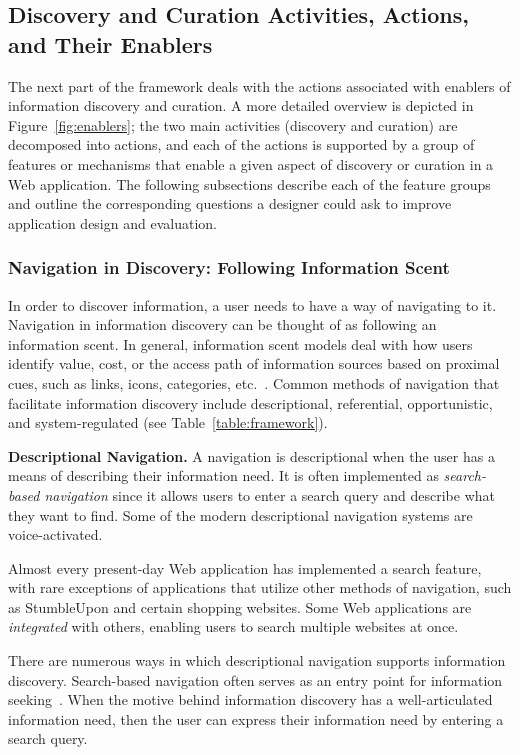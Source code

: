 \documentclass{sigchi}
\begin{document}
{\subsection{Discovery and Curation Activities, Actions, and Their \mbox{Enablers}}

The next part of the framework deals with the actions associated with enablers of information discovery and curation. A more detailed overview is depicted in Figure~\ref{fig:enablers}; the two main activities (discovery and curation) are decomposed into actions, and each of the actions is supported by a group of features or mechanisms that enable a given aspect of discovery or curation in a Web application.  The following subsections describe each of the feature groups and outline the corresponding questions a designer could ask to improve application design and evaluation.  

{\subsubsection{Navigation in Discovery: Following Information Scent}
In order to discover information, a user needs to have a way of navigating to it. Navigation in information discovery can be thought of as following an information scent. In general, information scent models deal with how users identify value, cost, or the access path of information sources based on proximal cues, such as links, icons, categories, etc.~\cite{pirolli1999information}. Common methods of navigation that facilitate information discovery include descriptional, referential, opportunistic, and system-regulated (see Table~\ref{table:framework}). 

\textbf{Descriptional Navigation.} A navigation is descriptional when the user has a means of describing their information need. It is often implemented as \textit{search-based navigation} since it allows users to enter a search query and describe what they want to find. Some of the modern descriptional navigation systems are voice-activated. 

Almost every present-day Web application has implemented a search feature, with rare exceptions of applications that utilize other methods of navigation, such as StumbleUpon and certain shopping websites. Some Web applications are \textit{integrated} with others, enabling users to search multiple websites at once.    

There are numerous ways in which descriptional navigation supports information discovery. Search-based navigation often serves as an entry point for information seeking~\cite{levene2011introduction}. When the motive behind information discovery has a well-articulated information need, then the user can express their information need by entering a search query. 

}}
\end{document}
